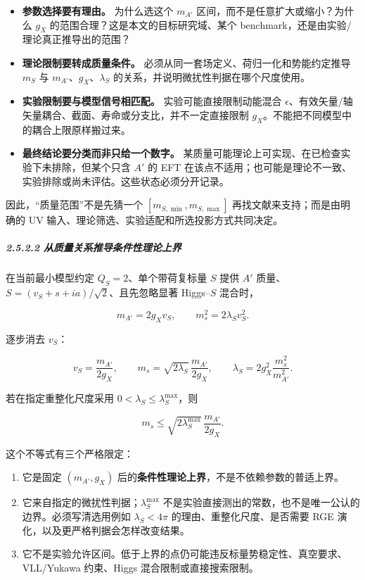 \documentclass[
  chinese,
  UTF8]{ctexart}
\providecommand{\tightlist}{%
  \setlength{\itemsep}{0pt}\setlength{\parskip}{0pt}}
\begin{document}
\begin{itemize}
\tightlist
\item
  \textbf{参数选择要有理由。} 为什么选这个 \(m_{A'}\)
  区间，而不是任意扩大或缩小？为什么 \(g_X\)
  的范围合理？这是本文的目标研究域、某个
  benchmark，还是由实验/理论真正推导出的范围？
\item
  \textbf{理论限制要转成质量条件。}
  必须从同一套场定义、荷归一化和势能约定推导 \(m_S\) 与
  \(m_{A'}\)、\(g_X\)、\(\lambda_S\)
  的关系，并说明微扰性判据在哪个尺度使用。
\item
  \textbf{实验限制要与模型信号相匹配。} 实验可能直接限制动能混合
  \(\epsilon\)、有效矢量/轴矢量耦合、截面、寿命或分支比，并不一定直接限制
  \(g_X\)。不能把不同模型中的耦合上限原样搬过来。
\item
  \textbf{最终结论要分类而非只给一个数字。}
  某质量可能理论上可实现、在已检查实验下未排除，但某个只含 \(A'\) 的 EFT
  在该点不适用；也可能是理论不一致、实验排除或尚未评估。这些状态必须分开记录。
\end{itemize}

因此，``质量范围''不是先猜一个 \([m_{S,\min},m_{S,\max}]\)
再找文献来支持；而是由明确的 UV
输入、理论筛选、实验适配和所选投影方式共同决定。

\subparagraph{2.5.2.2
从质量关系推导条件性理论上界}\label{ux4eceux8d28ux91cfux5173ux7cfbux63a8ux5bfcux6761ux4ef6ux6027ux7406ux8bbaux4e0aux754c}

在当前最小模型约定 \(Q_S=2\)、单个带荷复标量 \(S\) 提供 \(A'\)
质量、\(S=(v_S+s+ia)/\sqrt2\)、且先忽略显著 Higgs--\(S\) 混合时，

\[m_{A'}=2g_Xv_S,\qquad m_s^2=2\lambda_Sv_S^2.\]

逐步消去 \(v_S\)：

\[v_S=\frac{m_{A'}}{2g_X},\qquad m_s=\sqrt{2\lambda_S}\,\frac{m_{A'}}{2g_X},\qquad \lambda_S=2g_X^2\frac{m_s^2}{m_{A'}^2}.\]

若在指定重整化尺度采用 \(0<\lambda_S\leq\lambda_S^{\max}\)，则

\[\boxed{m_s\leq \sqrt{2\lambda_S^{\max}}\,\frac{m_{A'}}{2g_X}}.\]

这个不等式有三个严格限定：

\begin{enumerate}
\def\labelenumi{\arabic{enumi}.}
\tightlist
\item
  它是固定 \((m_{A'},g_X)\)
  后的\textbf{条件性理论上界}，不是不依赖参数的普适上界。
\item
  它来自指定的微扰性判据；\(\lambda_S^{\max}\)
  不是实验直接测出的常数，也不是唯一公认的边界。必须写清选用例如
  \(\lambda_S<4\pi\) 的理由、重整化尺度、是否需要 RGE
  演化，以及更严格判据会怎样改变结果。
\item
  它不是实验允许区间。低于上界的点仍可能违反标量势稳定性、真空要求、VLL/Yukawa
  约束、Higgs 混合限制或直接搜索限制。
\end{enumerate}
\end{document}
